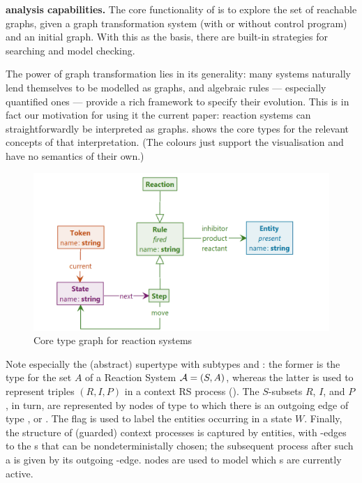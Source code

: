 \textbf{\GROOVE analysis capabilities.}
The core functionality of \GROOVE is to explore the set of reachable graphs, given a graph transformation system (with or without control program) and an initial graph. With this as the basis, there are built-in strategies for searching and model checking.

The power of graph transformation lies in its generality: many systems naturally lend themselves to be modelled as graphs, and algebraic rules --- especially quantified ones --- provide a rich framework to specify their evolution. This is in fact our motivation for using it the current paper: reaction systems can straightforwardly be interpreted as graphs.  shows the core types for the relevant concepts of that interpretation. (The colours just support the visualisation and have no semantics of their own.)

\begin{figure}
\centering
\includegraphics[scale=.2]{figs/core-type}
\caption{Core type graph for reaction systems}
\label{fig:core-type}
\end{figure}
%
Note especially the (abstract) supertype \Rule with subtypes \Reaction and \Step: the former is the type for the set $A$ of a Reaction System ${\cal A}=(S,A)$, whereas the latter is used to represent triples $(R,I,P)$ in a context RS process (). The $S$-subsets $R$, $I$, and $P$, in turn, are represented by nodes of type \Entity to which there is an outgoing edge of type \reactant, \inhibitor or \product. The flag \present is used to label the entities occurring in a state $W$. Finally, the structure of (guarded) context processes is captured by \State entities, with \nextt-edges to the \Step{}s that can be nondeterministally chosen; the subsequent process after such a \Step is given by its outgoing \move-edge. \Token nodes are used to model which \State{}s are currently active.

